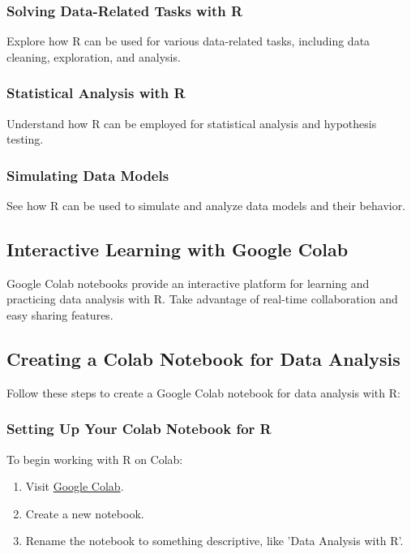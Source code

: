 \documentclass[a4paper,12pt]{book}
\begin{document}
\subsubsection*{Solving Data-Related Tasks with R}
Explore how R can be used for various data-related tasks, including data cleaning, exploration, and analysis.

\subsubsection*{Statistical Analysis with R}
Understand how R can be employed for statistical analysis and hypothesis testing.

\subsubsection*{Simulating Data Models}
See how R can be used to simulate and analyze data models and their behavior.

\subsection*{Interactive Learning with Google Colab}

Google Colab notebooks provide an interactive platform for learning and practicing data analysis with R. Take advantage of real-time collaboration and easy sharing features.

\subsection*{Creating a Colab Notebook for Data Analysis}

Follow these steps to create a Google Colab notebook for data analysis with R:

\subsubsection*{Setting Up Your Colab Notebook for R}
To begin working with R on Colab:

\begin{enumerate}
    \item Visit \href{https://colab.research.google.com/}{Google Colab}.
    \item Create a new notebook.
    \item Rename the notebook to something descriptive, like 'Data Analysis with R'.
\end{enumerate}
\end{document}
